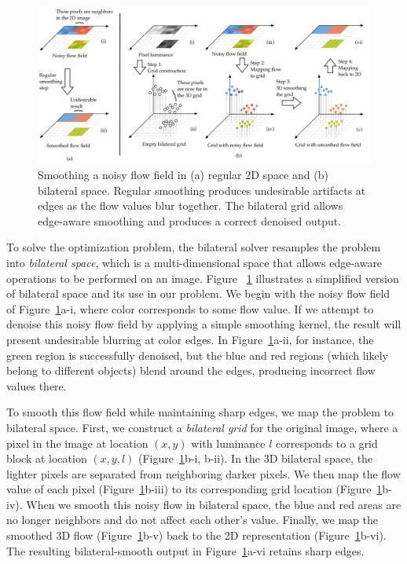 \begin{figure}
\centering%
\center
\includegraphics[width=\textwidth]{hfbs-figs/bilateral_grid_3d.pdf}
\caption{Smoothing a noisy flow field in (a) regular 2D space and (b) bilateral space. Regular smoothing produces undesirable artifacts at edges as the flow values blur together. The bilateral grid allows edge-aware smoothing and produces a correct denoised output.}%
\label{fig:bilateral_grid_3d}%
\end{figure}

To solve the optimization problem, the bilateral solver resamples the problem into \emph{bilateral space}, which is a multi-dimensional space that allows edge-aware operations to be performed on an image.
Figure ~\ref{fig:bilateral_grid_3d} illustrates a simplified version of bilateral space and its use in our problem.
We begin with the noisy flow field of Figure~\ref{fig:bilateral_grid_3d}a-i, where color corresponds to some flow value.
If we attempt to denoise this noisy flow field by applying a simple smoothing kernel, the result will present undesirable blurring at color edges.
In Figure~\ref{fig:bilateral_grid_3d}a-ii, for instance, the green region is successfully denoised, but the blue and red regions (which likely belong to different objects) blend around the edges, producing incorrect flow values there.


To smooth this flow field while maintaining sharp edges, we map the problem to bilateral space.
First, we construct a \emph{bilateral grid} for the original image, where a pixel in the image at location $(x,y)$ with luminance $l$ corresponds to a grid block at location $(x,y,l)$ (Figure~\ref{fig:bilateral_grid_3d}b-i, b-ii).
In the 3D bilateral space, the lighter pixels are separated from neighboring darker pixels.
We then map the flow value of each pixel (Figure~\ref{fig:bilateral_grid_3d}b-iii) to its corresponding grid location (Figure~\ref{fig:bilateral_grid_3d}b-iv).
When we smooth this noisy flow in bilateral space, the blue and red areas are no longer neighbors and do not affect each other's value.
Finally, we map the smoothed 3D flow (Figure~\ref{fig:bilateral_grid_3d}b-v) back to the 2D representation (Figure~\ref{fig:bilateral_grid_3d}b-vi).
The resulting  bilateral-smooth output in Figure~\ref{fig:bilateral_grid_3d}a-vi retains sharp edges.
